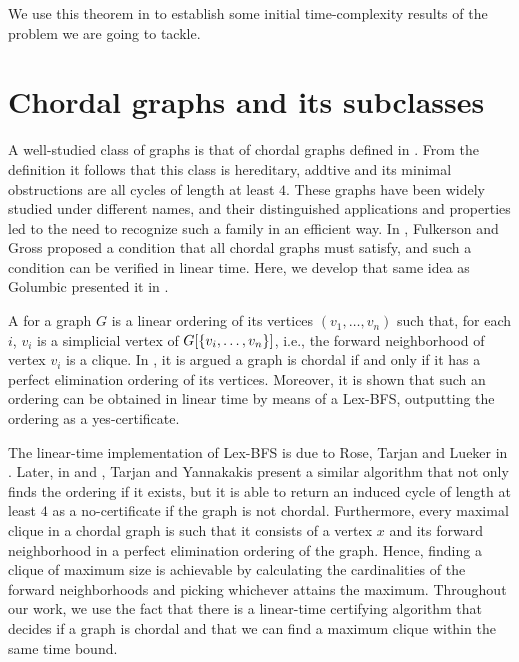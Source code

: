 We use this theorem in  to establish some initial
time-complexity results of the problem we are going to tackle.


\section{Chordal graphs and its subclasses}
\label{sec:chordal-defs}

A well-studied class of graphs is that of chordal graphs defined in
. From the definition it follows that this class is hereditary,
addtive and its minimal obstructions are all cycles of length at least $4$.
These graphs have been widely studied under different names, and their
distinguished applications and properties led to the need to recognize such a
family in an efficient way. In \cite{fulkerson1965}, Fulkerson and Gross
proposed a condition that all chordal graphs must satisfy, and such a condition
can be verified in linear time. Here, we develop that same idea as Golumbic
presented it in \cite{golumbic2004}.

A  for a graph $G$ is a linear ordering of
its vertices $(v_1,\dots,v_n)$ such that, for each $i$, $v_i$ is a simplicial
vertex of $G[\left\{v_i,\dots, v_n\right\}]$, i.e., the forward neighborhood of vertex
$v_i$ is a clique. In \cite{golumbic2004}, it is argued a graph is chordal if
and only if it has a perfect elimination ordering of its vertices. Moreover, it
is shown that such an ordering can be obtained in linear time by means of a
Lex-BFS, outputting the ordering as a yes-certificate.

The linear-time implementation of Lex-BFS is due to Rose, Tarjan and Lueker in
\cite{lexbfs}. Later, in \cite{chordal-recog} and \cite{chordal-recog-addendum},
Tarjan and Yannakakis present a similar algorithm that not only finds the
ordering if it exists, but it is able to return an induced cycle of length at
least $4$ as a no-certificate if the graph is not chordal. Furthermore, every
maximal clique in a chordal graph is such that it consists of a vertex $x$ and
its forward neighborhood in a perfect elimination ordering of the graph. Hence,
finding a clique of maximum size is achievable by calculating the cardinalities
of the forward neighborhoods and picking whichever attains the maximum.
Throughout our work, we use the fact that there is a linear-time certifying
algorithm that decides if a graph is chordal and that we can find a maximum
clique within the same time bound.

